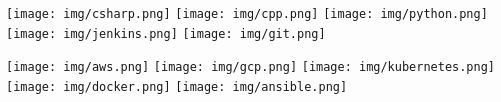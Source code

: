 {\centering
	
	\divider


}

\bigskip
{}

\bigskip
{}
{\centering
		\texttt{[image: img/csharp.png]}
		\texttt{[image: img/cpp.png]}
		\texttt{[image: img/python.png]}
		\texttt{[image: img/jenkins.png]}
		\texttt{[image: img/git.png]}

}

\bigskip
{}
{\centering
	\texttt{[image: img/aws.png]}
	\texttt{[image: img/gcp.png]}
	\texttt{[image: img/kubernetes.png]} 
	\texttt{[image: img/docker.png]}
	\texttt{[image: img/ansible.png]} 

}